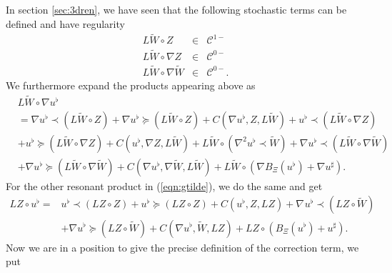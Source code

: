 \documentclass[11pt, oneside]{article}   	%
\newcommand{\CC}{\mathscr{C}}
\begin{document}
In section \ref{sec:3dren}, we have seen that the following stochastic terms can be defined  and have regularity
\begin{eqnarray*}
	L \widetilde{W} \circ Z & \in & \CC^{1 -}\\
	L \widetilde{W} \circ \nabla Z & \in & \CC^{0 -}\\
	L \widetilde{W} \circ \nabla \widetilde{W} & \in & \CC^{0 -} .
\end{eqnarray*}
We furthermore expand the products appearing above as
\begin{align*}
& L \widetilde{W} \circ \nabla u^{\flat} \\  &=  \nabla u^{\flat} \prec (L \widetilde{W}
\circ Z) + \nabla u^{\flat} \succcurlyeq (L \widetilde{W} \circ Z) + C (\nabla
u^{\flat}, Z, L \widetilde{W}) + u^{\flat} \prec (L \widetilde{W} \circ \nabla Z)\\ &+
u^{\flat} \succcurlyeq (L \widetilde{W} \circ \nabla Z) + C (u^{\flat}, \nabla
Z, L \widetilde{W}) + L \widetilde{W} \circ (\nabla^2 u^{\flat} \prec \widetilde{W}) +
\nabla u^{\flat} \prec (L \widetilde{W} \circ \nabla \widetilde{W}) \\ &+ \nabla
u^{\flat} \succcurlyeq (L \widetilde{W} \circ \nabla \widetilde{W})+ C (\nabla
u^{\flat}, \nabla \widetilde{W}, L \widetilde{W}) + L \widetilde{W} \circ (\nabla
B_{\Xi} (u^{\flat}) + \nabla u^{\sharp}) .
\end{align*}
For the other resonant product in (\ref{eqn:gtilde}), we do the same and get
\begin{align*}
L Z \circ u^{\flat}  = & u^{\flat} \prec (L Z \circ Z) + u^{\flat}
\succcurlyeq (L Z \circ Z) + C (u^{\flat}, Z, L Z) + \nabla^{} u^{\flat}
\prec (L Z \circ \widetilde{W})\\& + \nabla u^{\flat} \succcurlyeq (L Z \circ \widetilde{W})
+ C (\nabla u^{\flat}, \widetilde{W}, L Z) + L Z \circ (B_{\Xi} (u^{\flat}) +
u^{\sharp}) .
\end{align*}
Now we are in a position to give the precise definition of the correction term, we put
\end{document}
